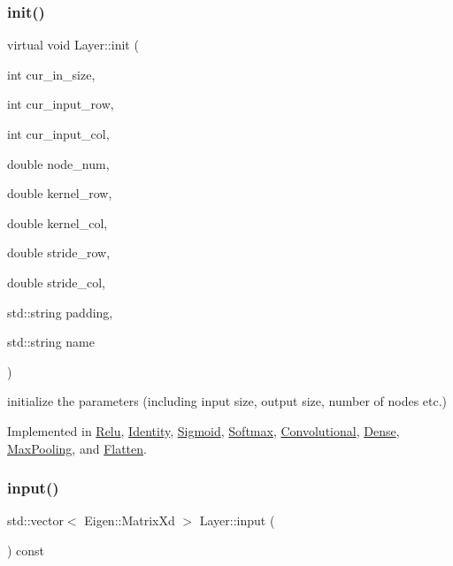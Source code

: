 \subsubsection{\texorpdfstring{init()}{init()}}
{\footnotesize\ttfamily virtual void Layer\+::init (\begin{DoxyParamCaption}\item[{int}]{cur\+\_\+in\+\_\+size,  }\item[{int}]{cur\+\_\+input\+\_\+row,  }\item[{int}]{cur\+\_\+input\+\_\+col,  }\item[{double}]{node\+\_\+num,  }\item[{double}]{kernel\+\_\+row,  }\item[{double}]{kernel\+\_\+col,  }\item[{double}]{stride\+\_\+row,  }\item[{double}]{stride\+\_\+col,  }\item[{std\+::string}]{padding,  }\item[{std\+::string}]{name }\end{DoxyParamCaption})\hspace{0.3cm}{\ttfamily [pure virtual]}}



initialize the parameters (including input size, output size, number of nodes etc.) 



Implemented in \hyperlink{class_relu_a3efe8891f86dea80500302d7cd9fe605}{Relu}, \hyperlink{class_identity_adcf6d70548e5f5d63d1919c79fb1bcce}{Identity}, \hyperlink{class_sigmoid_af70d4bfe6e3f507457067fc801256928}{Sigmoid}, \hyperlink{class_softmax_ae1a672376cc4a904cedb36ad8b8df717}{Softmax}, \hyperlink{class_convolutional_a40c5772cf002e82be65a03547042c828}{Convolutional}, \hyperlink{class_dense_a681837f518909d237e26aa195274218c}{Dense}, \hyperlink{class_max_pooling_ae1834354ff21a90fe14d1a392e923fc4}{Max\+Pooling}, and \hyperlink{class_flatten_af389526bc8d45a447eaf2a3f8336d2a8}{Flatten}.

\mbox{\label{class_layer_a5213366d9a5a7317c5d40d9efdcfa623}} 
\subsubsection{\texorpdfstring{input()}{input()}}
{\footnotesize\ttfamily std\+::vector$<$ Eigen\+::\+Matrix\+Xd $>$ Layer\+::input (\begin{DoxyParamCaption}{ }\end{DoxyParamCaption}) const}



